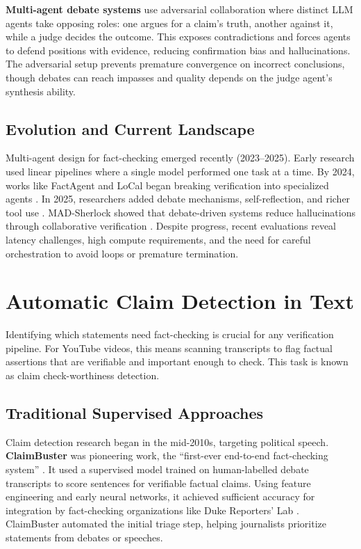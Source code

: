 \documentclass[12pt,a4paper]{article}
\begin{document}
\textbf{Multi-agent debate systems} \citep{ma2025guided, lakara2025madsherlock} use adversarial collaboration where distinct LLM agents take opposing roles: one argues for a claim's truth, another against it, while a judge decides the outcome. This exposes contradictions and forces agents to defend positions with evidence, reducing confirmation bias and hallucinations. The adversarial setup prevents premature convergence on incorrect conclusions, though debates can reach impasses and quality depends on the judge agent's synthesis ability.

\subsection{Evolution and Current Landscape}

Multi-agent design for fact-checking emerged recently (2023–2025). Early research used linear pipelines where a single model performed one task at a time. By 2024, works like FactAgent and LoCal began breaking verification into specialized agents \citep{hysonlab2025factagent, chen2024local}. In 2025, researchers added debate mechanisms, self-reflection, and richer tool use \citep{ma2025guided, icwsm2025workshop, tian2024webagents}. MAD-Sherlock showed that debate-driven systems reduce hallucinations through collaborative verification \citep{lakara2025madsherlock}. Despite progress, recent evaluations reveal latency challenges, high compute requirements, and the need for careful orchestration to avoid loops or premature termination.

\section{Automatic Claim Detection in Text}

Identifying which statements need fact-checking is crucial for any verification pipeline. For YouTube videos, this means scanning transcripts to flag factual assertions that are verifiable and important enough to check. This task is known as claim check-worthiness detection.

\subsection{Traditional Supervised Approaches}

Claim detection research began in the mid-2010s, targeting political speech. \textbf{ClaimBuster} was pioneering work, the ``first-ever end-to-end fact-checking system'' \citep{hassan2021claimbuster}. It used a supervised model trained on human-labelled debate transcripts to score sentences for verifiable factual claims. Using feature engineering and early neural networks, it achieved sufficient accuracy for integration by fact-checking organizations like Duke Reporters' Lab \citep{hassan2021claimbuster}. ClaimBuster automated the initial triage step, helping journalists prioritize statements from debates or speeches.
\end{document}
